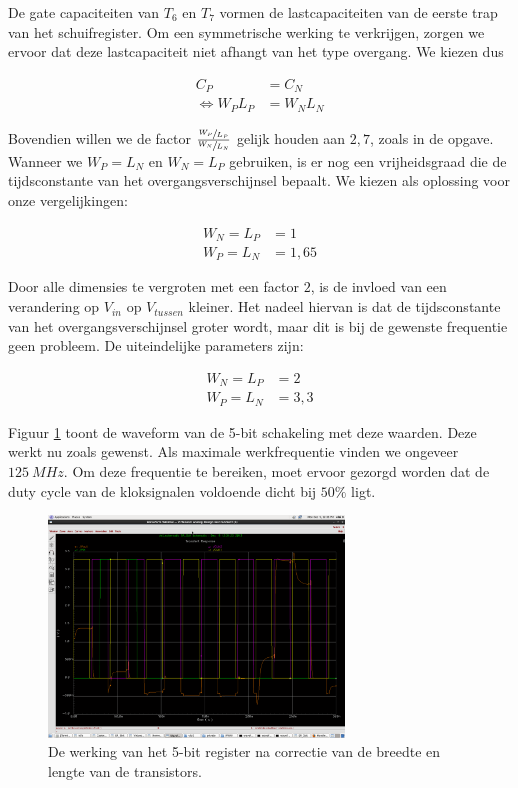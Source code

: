 \documentclass[11pt,a4paper,oneside,dutch]{article}
\begin{document}
De gate capaciteiten van $T_6$ en $T_7$ vormen de lastcapaciteiten van de eerste trap van het schuifregister. Om een symmetrische werking te verkrijgen, zorgen we ervoor dat deze lastcapaciteit niet afhangt van het type overgang. We kiezen dus

\begin{align*}
C_P &= C_N \\
\Leftrightarrow W_P L_P &= W_N L_N
\end{align*}

Bovendien willen we de factor $\frac{\sfrac{W_P}{L_P}}{\sfrac{W_N}{L_N}}$ gelijk houden aan $2,7$, zoals in de opgave. Wanneer we $W_P = L_N$ en $W_N = L_P$ gebruiken, is er nog een vrijheidsgraad die de tijdsconstante van het overgangsverschijnsel bepaalt. We kiezen als oplossing voor onze vergelijkingen:

\begin{align*}
W_N = L_P &= 1 \\
W_P = L_N &= 1,65
\end{align*}

Door alle dimensies te vergroten met een factor $2$, is de invloed van een verandering op $V_{in}$ op $V_{tussen}$ kleiner. Het nadeel hiervan is dat de tijdsconstante van het overgangsverschijnsel groter wordt, maar dit is bij de gewenste frequentie geen probleem. De uiteindelijke parameters zijn:

\begin{align*}
W_N = L_P &= 2 \\
W_P = L_N &= 3,3
\end{align*}

Figuur \ref{fig:wave_optimaal} toont de waveform van de 5-bit schakeling met deze waarden. Deze werkt nu zoals gewenst. Als maximale werkfrequentie vinden we ongeveer $\SI{125}{MHz}$. Om deze frequentie te bereiken, moet ervoor gezorgd worden dat de duty cycle van de kloksignalen voldoende dicht bij $50\%$ ligt.

\begin{figure}[htp]
	\centering
	\includegraphics[width=0.7\textwidth]{wave_optimaal.png}
	\caption{De werking van het 5-bit register na correctie van de breedte en lengte van de transistors.}
	\label{fig:wave_optimaal}
\end{figure}
\end{document}

